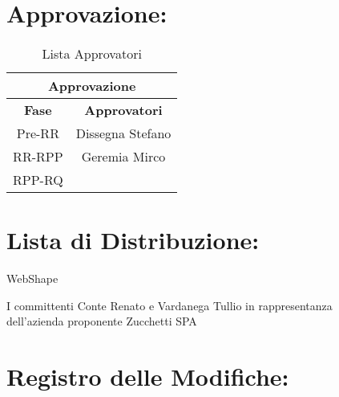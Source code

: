 \section*{\LARGE Approvazione:}

\begin{table}[!h]
	\begin{center}
		\begin{tabular}
			{|c|c|}
			\hline
			\multicolumn{2}{|c|}{ \textbf{Approvazione} } \\
			\hline
			\textbf{Fase} & \textbf{Approvatori} \\
			\hline
			{Pre-RR} &  Dissegna Stefano \\
			\hline
			{RR-RPP} & Geremia Mirco \\
			\hline
			{RPP-RQ} & \\
			\hline
		\end{tabular}
		\caption{Lista Approvatori} %
		\label{tabapprovazione}
	\end{center}
\end{table}
\textbf{}

\section*{\LARGE Lista di Distribuzione:}

	\begin{elenconumerato}{\normindent}
		\item WebShape 
     	\item I committenti Conte Renato e Vardanega Tullio in rappresentanza \\  dell'azienda proponente Zucchetti SPA
	\end{elenconumerato}

\newpage


\section*{\LARGE Registro delle Modifiche:}

